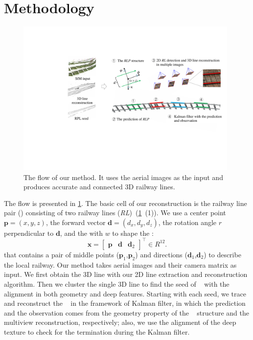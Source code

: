 \section{Methodology}
\begin{figure}
    \centering
    \includegraphics[width=0.98\textwidth]{images/overview.pdf}
    \caption{The flow of our method.
    It uses the aerial images as the input and produces accurate
    and connected 3D railway lines.}
    \label{fig_overview}
\end{figure}

The flow is presented in \cref{fig_overview}.
The basic cell of our reconstruction is the railway line pair (\rlp) consisting of two railway lines (\textit{RL})~(\cref{fig_overview}~(1)).
We use a center point $\mathbf p=\left(x,y,z\right)$,
the forward vector $\mathbf d=\left(d_x,d_y,d_z\right)$,
the rotation angle $r$ perpendicular to $\mathbf d$,
and the with $w$ to shape the \rlp:
\begin{equation}
\mathbf x = \begin{bmatrix}
    \mathbf p  & \mathbf d  & \mathbf d_2 
\end{bmatrix}^ \top \in R^{12}.
\label{eq_prediction3} 
\end{equation}
that contains a pair of middle points ($\mathbf p_1$,$ \mathbf p_2$) and directions ($\mathbf d_1$,$\mathbf d_2$) to describe the local railway.
Our method takes aerial images and their camera matrix as input.
We first obtain the 3D line with our 2D line extraction and reconstruction algorithm.
Then
we cluster the single 3D line to find the seed of \rlp~ with the alignment in both geometry and deep features.
Starting with each seed,
we trace and reconstruct the \rlp~ in the framework of Kalman filter,
in which the prediction and the observation comes from the geometry property of the \rlp~ structure
and the multiview reconstruction,
respectively;
also,
we use the alignment of the deep texture to check for the termination during the Kalman filter.


